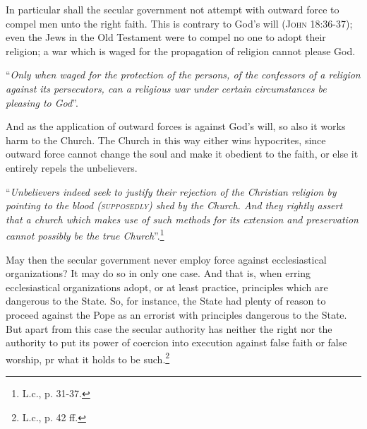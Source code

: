                In particular shall the secular government not attempt with outward force to compel men unto the right faith.  This is contrary to God’s will {\scriptsize\textsc{(John 18:36-37)}}; even the Jews in the Old Testament were to compel no one to adopt their religion; a war which is waged for the propagation of religion cannot please God.  \begin{displayquote}“\textit{Only when waged for the protection of the persons, of the confessors of a religion against its persecutors, can a religious war under certain circumstances be pleasing to God}”.\end{displayquote}  And as the application of outward forces is against God’s will, so also it works harm to the Church.  The Church in this way either wins hypocrites, since outward force cannot change the soul and make it obedient to the faith, or else it entirely repels the unbelievers.  \begin{displayquote}“\textit{Unbelievers indeed seek to justify their rejection of the Christian religion by pointing to the blood {\scriptsize\textsc{(supposedly)}} shed by the Church.  And they rightly assert that a church which makes use of such methods for its extension and preservation cannot possibly be the true Church}”.\footnote{L.c., p. 31-37.}\end{displayquote}  May then the secular government never employ force against ecclesiastical organizations?  It may do so in only one case.  And that is, when erring ecclesiastical organizations adopt, or at least practice, principles which are dangerous to the State.  So, for instance, the State had plenty of reason to proceed against the Pope as an errorist with principles dangerous to the State.  But apart from this case the secular authority has neither the right nor the authority to put its power of coercion into execution against false faith or false worship, pr what it holds to be such.\footnote{L.c., p. 42 ff.}

